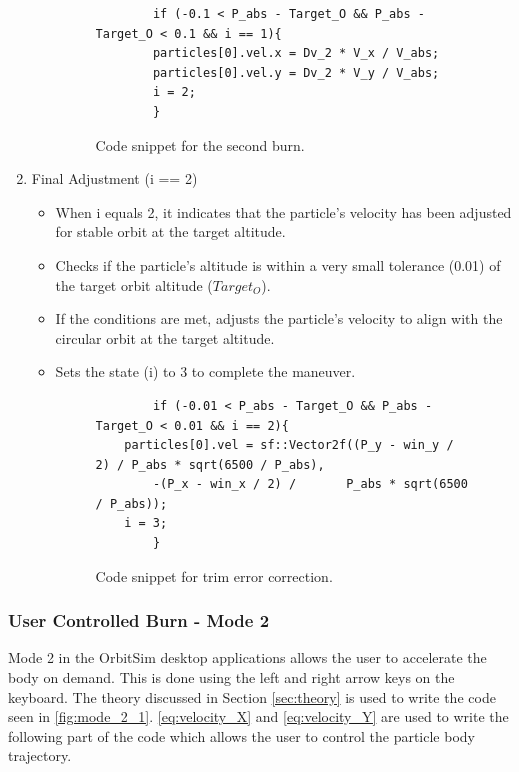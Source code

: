 \documentclass[12pt, letter]{article}
\begin{document}
\begin{enumerate}
\begin{itemize}
        
        \begin{figure}[H]
        \begin{verbatim}
        if (-0.1 < P_abs - Target_O && P_abs - Target_O < 0.1 && i == 1){
        particles[0].vel.x = Dv_2 * V_x / V_abs;
        particles[0].vel.y = Dv_2 * V_y / V_abs;
        i = 2;
        }
        \end{verbatim}
        \caption{Code snippet for the second burn.}
        \label{fig:class_particle}
        \end{figure}
    \end{itemize}


    \item Final Adjustment (i == 2)
    \begin{itemize}
        \item When i equals 2, it indicates that the particle's velocity has been adjusted for stable orbit at the target altitude.
        \item Checks if the particle's altitude is within a very small tolerance (0.01) of the target orbit altitude ($Target_O$).
        \item If the conditions are met, adjusts the particle's velocity to align with the circular orbit at the target altitude.
        \item Sets the state (i) to 3 to complete the maneuver.
        \begin{figure}[H]
        \begin{verbatim}
        if (-0.01 < P_abs - Target_O && P_abs - Target_O < 0.01 && i == 2){
	particles[0].vel = sf::Vector2f((P_y - win_y / 2) / P_abs * sqrt(6500 / P_abs),
        -(P_x - win_x / 2) /       P_abs * sqrt(6500 / P_abs));
	i = 3;
        }
        \end{verbatim}
        \caption{Code snippet for trim error correction.}
        \label{fig:class_particle}
        \end{figure}
    \end{itemize}
    
\end{enumerate}


\subsubsection{User Controlled Burn - Mode 2}
Mode 2 in the OrbitSim desktop applications allows the user to accelerate the body on demand. This is done using the left and right arrow keys on the keyboard. The theory discussed in Section \ref{sec:theory} is used to write the code seen in \autoref{fig:mode_2_1}. \autoref{eq:velocity_X} and \autoref{eq:velocity_Y} are used to write the following part of the code which allows the user to control the particle body trajectory.
\end{document}
